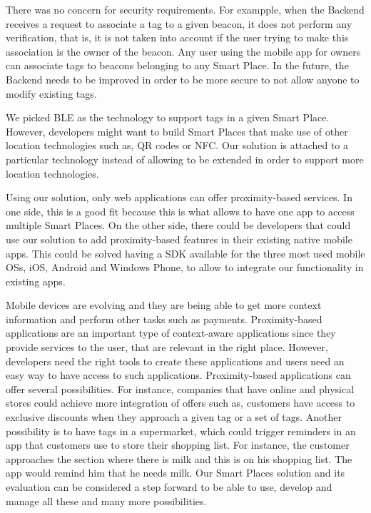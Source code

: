 There was no concern for security requirements. For exampple, when the Backend receives a request to associate a tag to a given beacon, it does not perform any verification, that is, it is not taken into account if the user trying to make this association is the owner of the beacon.
Any user using the mobile app for owners can associate tags to beacons belonging to any Smart Place.
In the future, the Backend needs to be improved in order to be more secure to not allow anyone to modify existing tags.

We picked \gls{BLE} as the technology to support tags in a given Smart Place.
However, developers might want to build Smart Places that make use of other location technologies such as, \gls{QR} codes or \gls{NFC}.
Our solution is attached to a particular technology instead of allowing to be extended in order to support more location technologies.

Using our solution, only web applications can offer proximity-based services.
In one side, this is a good fit because this is what allows to have one app to access multiple Smart Places.
On the other side, there could be developers that could use our solution to add proximity-based features in their existing native mobile apps.
This could be solved having a \gls{SDK} available for the three most used mobile \glspl{OS}, iOS, Android and Windows Phone, to allow to integrate our functionality in existing apps.

Mobile devices are evolving and they are being able to get more context information and perform other tasks such as payments.
Proximity-based applications are an important type of context-aware applications since they provide services to the user, that are relevant in the right place.
However, developers need the right tools to create these applications and users need an easy way to have access to such applications.
Proximity-based applications can offer several possibilities.
For instance, companies that have online and physical stores could achieve more integration of offers such as, customers have access to exclusive discounts when they approach a given tag or a set of tags.
Another possibility is to have tags in a supermarket, which could trigger reminders in an app that customers use to store their shopping list.
For instance, the customer approaches the section where there is milk and this is on his shopping list. The app would remind him that he needs milk.
Our Smart Places solution and its evaluation can be considered a step forward to be able to use, develop and manage all these and many more possibilities.
